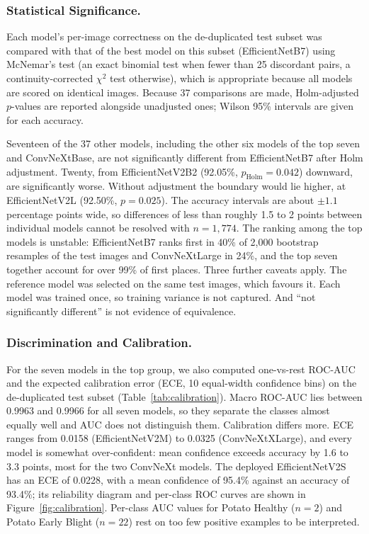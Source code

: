 \subsubsection{Statistical Significance.}
\label{sec:stat_sig}
Each model's per-image correctness on the de-duplicated test subset was compared with that of the best model on this subset (EfficientNetB7) using McNemar's test (an exact binomial test when fewer than 25 discordant pairs, a continuity-corrected $\chi^2$ test otherwise), which is appropriate because all models are scored on identical images. Because 37 comparisons are made, Holm-adjusted $p$-values are reported alongside unadjusted ones; Wilson 95\% intervals are given for each accuracy.

Seventeen of the 37 other models, including the other six models of the top seven and ConvNeXtBase, are not significantly different from EfficientNetB7 after Holm adjustment. Twenty, from EfficientNetV2B2 (92.05\%, $p_{\mathrm{Holm}}=0.042$) downward, are significantly worse. Without adjustment the boundary would lie higher, at EfficientNetV2L (92.50\%, $p=0.025$). The accuracy intervals are about $\pm1.1$ percentage points wide, so differences of less than roughly 1.5 to 2 points between individual models cannot be resolved with $n=1{,}774$. The ranking among the top models is unstable: EfficientNetB7 ranks first in 40\% of 2{,}000 bootstrap resamples of the test images and ConvNeXtLarge in 24\%, and the top seven together account for over 99\% of first places. Three further caveats apply. The reference model was selected on the same test images, which favours it. Each model was trained once, so training variance is not captured. And ``not significantly different'' is not evidence of equivalence.
\subsubsection{Discrimination and Calibration.}
\label{sec:calibration}
For the seven models in the top group, we also computed one-vs-rest ROC-AUC and the expected calibration error (ECE, 10 equal-width confidence bins) on the de-duplicated test subset (Table~\ref{tab:calibration}). Macro ROC-AUC lies between 0.9963 and 0.9966 for all seven models, so they separate the classes almost equally well and AUC does not distinguish them. Calibration differs more. ECE ranges from 0.0158 (EfficientNetV2M) to 0.0325 (ConvNeXtXLarge), and every model is somewhat over-confident: mean confidence exceeds accuracy by 1.6 to 3.3 points, most for the two ConvNeXt models. The deployed EfficientNetV2S has an ECE of 0.0228, with a mean confidence of 95.4\% against an accuracy of 93.4\%; its reliability diagram and per-class ROC curves are shown in Figure~\ref{fig:calibration}. Per-class AUC values for Potato Healthy ($n=2$) and Potato Early Blight ($n=22$) rest on too few positive examples to be interpreted.


